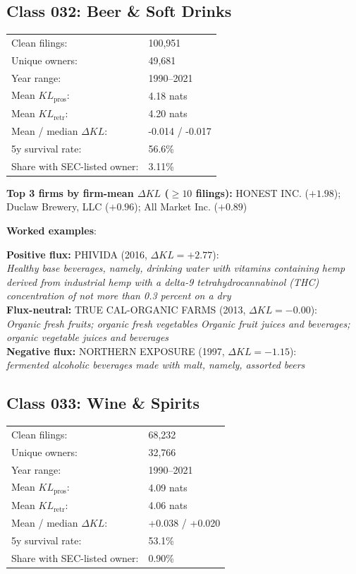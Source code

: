 \subsection*{Class 032: Beer \& Soft Drinks}
\label{app:industry-032}

\begin{tabular}{ll}
Clean filings: & 100,951 \\
Unique owners: & 49,681 \\
Year range: & 1990--2021 \\
Mean $KL_\text{pros}$: & 4.18 nats \\
Mean $KL_\text{retr}$: & 4.20 nats \\
Mean / median $\Delta KL$: & -0.014 / -0.017 \\
5y survival rate: & 56.6\% \\
Share with SEC-listed owner: & 3.11\% \\
\end{tabular}

\textbf{Top 3 firms by firm-mean $\Delta KL$ ($\geq 10$ filings):} HONEST INC. ($+1.98$); Duclaw Brewery, LLC ($+0.96$); All Market Inc. ($+0.89$)

\textbf{Worked examples}:

  \textbf{Positive flux:} \textsc{PHIVIDA} (2016, $\Delta KL=+2.77$):\\
  \textit{Healthy base beverages, namely, drinking water with vitamins containing hemp derived from industrial hemp with a delta-9 tetrahydrocannabinol (THC) concentration of not more than 0.3 percent on a dry }\\
  \textbf{Flux-neutral:} \textsc{TRUE CAL-ORGANIC FARMS} (2013, $\Delta KL=-0.00$):\\
  \textit{Organic fresh fruits; organic fresh vegetables Organic fruit juices and beverages; organic vegetable juices and beverages}\\
  \textbf{Negative flux:} \textsc{NORTHERN EXPOSURE} (1997, $\Delta KL=-1.15$):\\
  \textit{fermented alcoholic beverages made with malt, namely, assorted beers}\\

\subsection*{Class 033: Wine \& Spirits}
\label{app:industry-033}

\begin{tabular}{ll}
Clean filings: & 68,232 \\
Unique owners: & 32,766 \\
Year range: & 1990--2021 \\
Mean $KL_\text{pros}$: & 4.09 nats \\
Mean $KL_\text{retr}$: & 4.06 nats \\
Mean / median $\Delta KL$: & +0.038 / +0.020 \\
5y survival rate: & 53.1\% \\
Share with SEC-listed owner: & 0.90\% \\
\end{tabular}

